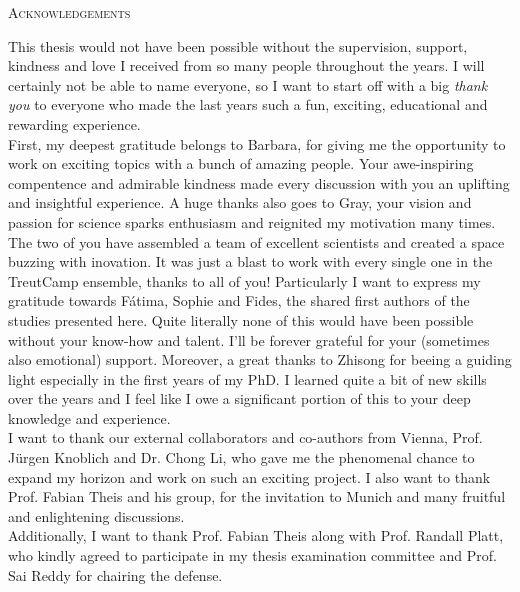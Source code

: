 \begin{center}
    \large\textsc{Acknowledgements}
\end{center}

This thesis would not have been possible without the supervision, support, kindness and love I received from so many people throughout the years. I will certainly not be able to name everyone, so I want to start off with a big \textit{thank you} to everyone who made the last years such a fun, exciting, educational and rewarding experience. \\

First, my deepest gratitude belongs to Barbara, for giving me the opportunity to work on exciting topics with a bunch of amazing people. Your awe-inspiring compentence and admirable kindness made every discussion with you an uplifting and insightful experience. A huge thanks also goes to Gray, your vision and passion for science sparks enthusiasm and reignited my motivation many times. The two of you have assembled a team of excellent scientists and created a space buzzing with inovation. It was just a blast to work with every single one in the TreutCamp ensemble, thanks to all of you! Particularly I want to express my gratitude towards Fátima, Sophie and Fides, the shared first authors of the studies presented here. Quite literally none of this would have been possible without your know-how and talent. I'll be forever grateful for your (sometimes also emotional) support. Moreover, a great thanks to Zhisong for beeing a guiding light especially in the first years of my PhD. I learned quite a bit of new skills over the years and I feel like I owe a significant portion of this to your deep knowledge and experience. \\

I want to thank our external collaborators and co-authors from Vienna, Prof. Jürgen Knoblich and Dr. Chong Li, who gave me the phenomenal chance to expand my horizon and work on such an exciting project. I also want to thank Prof. Fabian Theis and his group, for the invitation to Munich and many fruitful and enlightening discussions. \\

Additionally, I want to thank Prof. Fabian Theis along with Prof. Randall Platt, who kindly agreed to participate in my thesis examination committee and Prof. Sai Reddy for chairing the defense. \\

